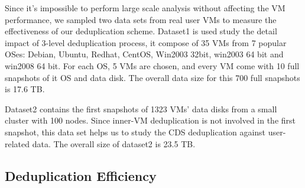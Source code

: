 

Since it's impossible to perform large scale analysis without affecting the VM performance,
we sampled two data sets from real user VMs to measure the effectiveness of our deduplication scheme.
Dataset1 is used study the detail impact of 3-level deduplication process,
it compose of 35 VMs from 7 popular OSes: 
Debian, Ubuntu, Redhat, CentOS, Win2003 32bit, win2003 64 bit and win2008 64 bit. For each OS, 
5 VMs are chosen, and every VM come with 10 full snapshots of it OS and data disk. 
The overall data size for this 700 full snapshots is 17.6 TB.

Dataset2 contains the first snapshots of 1323 VMs' data disks from a small cluster with 100 nodes. 
Since inner-VM deduplication is not involved in the first snapshot, this data set helps us to 
study the CDS deduplication against user-related data. The overall size of dataset2 is 23.5 TB.


\subsection{Deduplication Efficiency}


